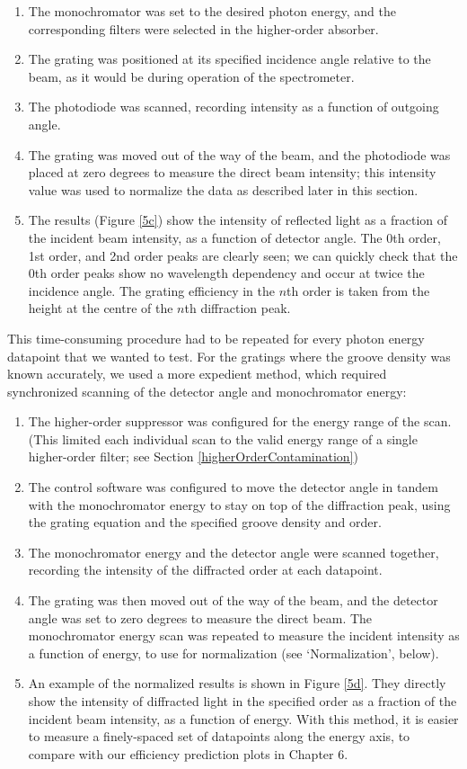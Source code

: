 	\begin{enumerate}
	\item The monochromator was set to the desired photon energy, and the corresponding filters were selected in the higher-order absorber.
	\item The grating was positioned at its specified incidence angle relative to the beam, as it would be during operation of the spectrometer.
	\item The photodiode was scanned, recording intensity as a function of outgoing angle.
	\item The grating was moved out of the way of the beam, and the photodiode was placed at zero degrees to measure the direct beam intensity; this intensity value was used to normalize the data as described later in this section. 
	\item The results (Figure \ref{5c}) show the intensity of reflected light as a fraction of the incident beam intensity, as a function of detector angle.  The 0th order, 1st order, and 2nd order peaks are clearly seen; we can quickly check that the 0th order peaks show no wavelength dependency and occur at twice the incidence angle.  The grating efficiency in the $n$th order is taken from the height at the centre of the $n$th diffraction peak.
	\end{enumerate}

This time-consuming procedure had to be repeated for every photon energy datapoint that we wanted to test.  For the gratings where the groove density was known accurately, we used a more expedient method, which required synchronized scanning of the detector angle and monochromator energy:

	\begin{enumerate}
	\item The higher-order suppressor was configured for the energy range of the scan. (This limited each individual scan to the valid energy range of a single higher-order filter; see Section \ref{higherOrderContamination})
	\item The control software was configured to move the detector angle in tandem with the monochromator energy to stay on top of the diffraction peak, using the grating equation and the specified groove density and order.
	\item The monochromator energy and the detector angle were scanned together, recording the intensity of the diffracted order at each datapoint.
	\item The grating was then moved out of the way of the beam, and the detector angle was set to zero degrees to measure the direct beam.  The monochromator energy scan was repeated to measure the incident intensity as a function of energy, to use for normalization (see `Normalization', below).
	\item An example of the normalized results is shown in Figure \ref{5d}. They directly show the intensity of diffracted light in the specified order as a fraction of the incident beam intensity, as a function of energy.  With this method, it is easier to measure a finely-spaced set of datapoints along the energy axis, to compare with our efficiency prediction plots in Chapter 6.
	\end{enumerate}

